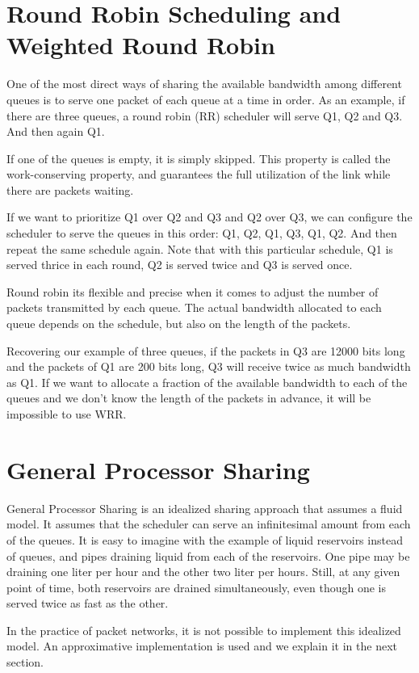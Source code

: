 \section{Round Robin Scheduling and Weighted Round Robin}

One of the most direct ways of sharing the available bandwidth among different queues is to serve one packet of each queue at a time in order.
As an example, if there are three queues, a round robin (RR) scheduler will serve Q1, Q2 and Q3.
And then again Q1.

If one of the queues is empty, it is simply skipped.
This property is called the work-conserving property, and guarantees the full utilization of the link while there are packets waiting.

If we want to prioritize Q1 over Q2 and Q3 and Q2 over Q3, we can configure the scheduler to serve the queues in this order: Q1, Q2, Q1, Q3, Q1, Q2.
And then repeat the same schedule again.
Note that with this particular schedule, Q1 is served thrice in each round, Q2 is served twice and Q3 is served once.

Round robin its flexible and precise when it comes to adjust the number of packets transmitted by each queue.
The actual bandwidth allocated to each queue depends on the schedule, but also on the length of the packets.

Recovering our example of three queues, if the packets in Q3 are 12000 bits long and the packets of Q1 are 200 bits long, Q3 will receive twice as much bandwidth as Q1.
If we want to allocate a fraction of the available bandwidth to each of the queues and we don't know the length of the packets in advance, it will be impossible to use WRR.

\section{General Processor Sharing}

General Processor Sharing is an idealized sharing approach that assumes a fluid model.
It assumes that the scheduler can serve an infinitesimal amount from each of the queues.
It is easy to imagine with the example of liquid reservoirs instead of queues, and pipes draining liquid from each of the reservoirs.
One pipe may be draining one liter per hour and the other two liter per hours.
Still, at any given point of time, both reservoirs are drained simultaneously, even though one is served twice as fast as the other.

In the practice of packet networks, it is not possible to implement this idealized model.
An approximative implementation is used and we explain it in the next section.

